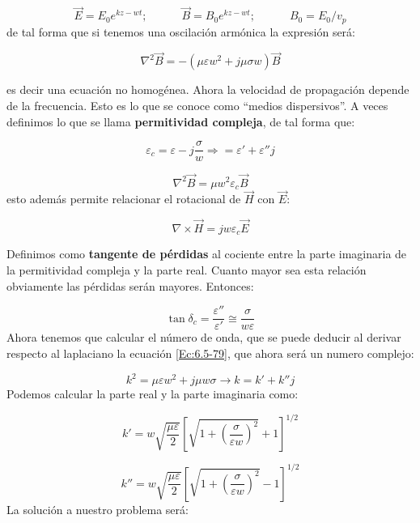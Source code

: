 \documentclass[12pt,a4paper]{article}
\newcommand{\parentesis}[1]{\left( #1  \right)}
\newcommand{\tquad}{\quad \quad \quad}
\newcommand{\rota}{\nabla \times}
\begin{document}
$$ \vec{E} = E_0 e^{kz-wt}; \tquad \vec{B} = B_0 e^{kz-wt}; \tquad B_0 = E_0/v_p  $$
de tal forma que si tenemos una oscilación armónica la expresión será:

\begin{equation}
\nabla^2 \vec{B} = - (\mu \varepsilon w^2 + j \mu \sigma w) \vec{B} \label{Ec:6.5-79} 
\end{equation}

es decir una ecuación no homogénea. Ahora la velocidad de propagación depende de la frecuencia. Esto es lo que se conoce como ``medios dispersivos''. A veces definimos lo que se llama \textbf{permitividad compleja}, de tal forma que:

\begin{equation}
\varepsilon_c = \varepsilon - j \dfrac{\sigma}{w} \Longrightarrow = \varepsilon' + \varepsilon'' j
\end{equation}

\begin{equation}
\nabla^2 \vec{B} = \mu w^2 \varepsilon_c \vec{B}
\end{equation}
esto además permite relacionar el rotacional de $\vec{H}$ con $\vec{E}$:

$$ \rota \vec{H} = j w \varepsilon_c  \vec{E}$$

Definimos como \textbf{tangente de pérdidas} al cociente entre la parte imaginaria de la permitividad compleja y la parte real. Cuanto mayor sea esta relación obviamente las pérdidas serán mayores. Entonces:

\begin{equation}
\tan \delta_c = \dfrac{\varepsilon ''}{ \varepsilon ' } \cong \dfrac{\sigma}{w \varepsilon}
\end{equation} 
Ahora tenemos que calcular el número de onda, que se puede deducir al derivar respecto al laplaciano la ecuación \ref{Ec:6.5-79}, que ahora será un numero complejo:

\begin{equation}
k^2 = \mu \varepsilon w^2 + j \mu w \sigma \longrightarrow k = k' + k'' j
\end{equation}
Podemos calcular la parte real y la parte imaginaria como:

$$ k' = w \sqrt{\dfrac{\mu \varepsilon}{2}} \left[ \sqrt{1+\parentesis{\dfrac{\sigma}{\varepsilon w}}^2} +1 \right]^{1/2} $$

$$k'' = w \sqrt{\dfrac{\mu \varepsilon}{2}} \left[ \sqrt{1+\parentesis{\dfrac{\sigma}{\varepsilon w}}^2} -1 \right]^{1/2} $$
La solución a nuestro problema será:
\end{document}
